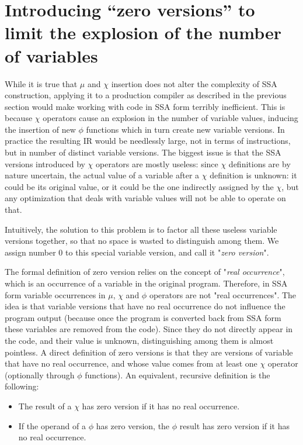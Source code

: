\section{Introducing ``zero versions'' to limit the explosion of the number of variables}

While it is true that $\mu$ and $\chi$ insertion does not alter the complexity of SSA construction, applying it to a production compiler as described in the previous section would make working with code in SSA form terribly inefficient.
This is because $\chi$ operators cause an explosion in the number of variable values, inducing the insertion of new $\phi$ functions which in turn create new variable versions.
In practice the resulting IR would be needlessly large, not in terms of instructions, but in number of distinct variable versions. The biggest issue is that the SSA versions introduced by $\chi$ operators are mostly useless: since $\chi$ definitions are by nature uncertain, the actual value of a variable after a $\chi$ definition is unknown: it could be its original value, or it could be the one indirectly assigned by the $\chi$, but any optimization that deals with variable values will not be able to operate on that.

Intuitively, the solution to this problem is to factor all these useless variable versions together, so that no space is wasted to distinguish among them. We assign number 0 to this special variable version, and call it "{\em zero version}".

The formal definition of zero version relies on the concept of "{\em real occurrence}", which is an occurrence of a variable in the original program. Therefore, in SSA form variable occurrences in $\mu$, $\chi$ and $\phi$ operators are not "real occurrences". The idea is that variable versions that have no real occurrence do not influence the program output (because once the program is converted back from SSA form these variables are removed from the code).
Since they do not directly appear in the code, and their value is unknown, distinguishing among them is almost pointless.
A direct definition of zero versions is that they are versions of variable that have no real occurrence, and whose value  comes from at least one $\chi$ operator (optionally through $\phi$ functions). An equivalent, recursive definition is the following:
\begin{itemize}
\item The result of a $\chi$ has zero version if it has no real occurrence.
\item If the operand of a $\phi$ has zero version, the $\phi$ result has zero version if it has no real occurrence.
\end{itemize}

